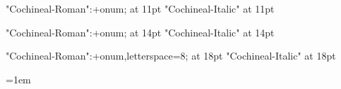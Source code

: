 



\font\elevenrm "Cochineal-Roman":+onum; at 11pt\relax
\font\elevenit "Cochineal-Italic" at 11pt\relax

\font\fourteenrm "Cochineal-Roman":+onum; at 14pt\relax
\font\fourteenit "Cochineal-Italic" at 14pt\relax

\font\eighteenrm "Cochineal-Roman":+onum,letterspace=8; at 18pt\relax
\font\eighteenit "Cochineal-Italic" at 18pt\relax


\def\normalsize{%
	\gdef\rm{\elevenrm}%
	\gdef\it{\elevenit}%
}

\def\chaptersize{%
	\gdef\rm{\fourteenrm}%
	\gdef\it{\fourteenit}%
}

\def\titlesize{%
	\gdef\rm{\eighteenrm}%
	\gdef\it{\eighteenit}%
}

\let\emph\it

\normalsize\rm


\baselineskip=14pt

\frenchspacing

\parskip=0pt

\parindent=1em

\emergencystretch=0pt
\hfuzz=0pt

\def\firstnoindent{\global\everypar={\wipeeverypar\setbox7=\lastbox}}
\def\wipeeverypar{\global\everypar={}}

{}



\pagewidth=148mm	
\pageheight=210mm

